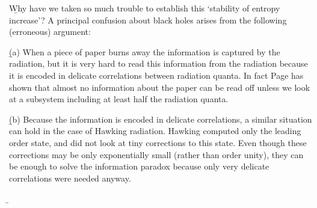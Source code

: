 \documentclass[12pt]{article}
\begin{document}
\b

Why have we taken so much trouble to establish this `stability of entropy increase'? 
A principal confusion about black holes arises from the following (erroneous) argument: 

\b

(a) When a piece of paper burns away the information is captured by the radiation, but it is very hard to read this information from the radiation because it is encoded in delicate correlations between radiation quanta. In fact Page \cite{page} has shown that almost no information about the paper can be read off unless we look at a subsystem including at least half the radiation quanta.

\b

(b) Because the information is encoded in delicate correlations, a similar situation can hold in the case of Hawking radiation. Hawking computed only the leading order state, and did not look at tiny corrections to this state. Even though these corrections may be only exponentially small (rather than order unity), they can be enough to solve the information paradox because only very delicate correlations were needed anyway.

\b
\end{document}

